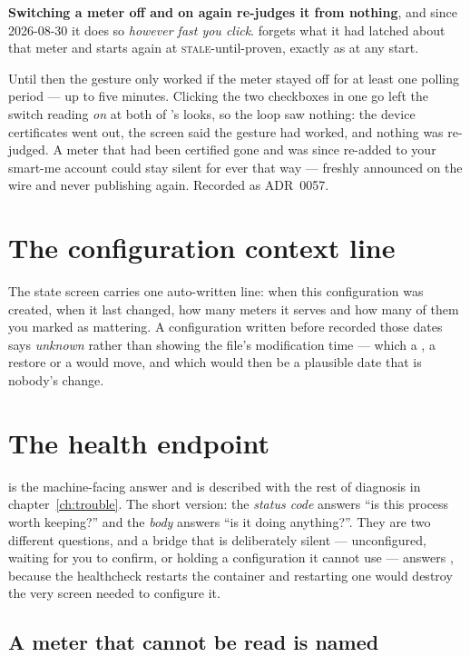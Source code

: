 \begin{note}
\textbf{Switching a meter off and on again re-judges it from nothing}, and since 2026-08-30 it
does so \emph{however fast you click}. \prog forgets what it had latched about that meter and
starts again at \textsc{stale}-until-proven, exactly as at any start.

Until then the gesture only worked if the meter stayed off for at least one polling period ---
up to five minutes. Clicking the two checkboxes in one go left the switch reading \emph{on} at
both of \prog's looks, so the loop saw nothing: the device certificates went out, the screen
said the gesture had worked, and nothing was re-judged. A meter that had been certified gone and
was since re-added to your smart-me account could stay silent for ever that way --- freshly
announced on the wire and never publishing again. Recorded as ADR~0057.
\end{note}

\section{The configuration context line}

The state screen carries one auto-written line: when this configuration was created, when it
last changed, how many meters it serves and how many of them you marked as mattering. A
configuration written before \prog recorded those dates says \emph{unknown} rather than
showing the file's modification time --- which a , a restore or a 
would move, and which would then be a plausible date that is nobody's change.

\section{The health endpoint}
\label{sec:healthz}

 is the machine-facing answer and is described with the rest of
diagnosis in chapter~\ref{ch:trouble}. The short version: the \emph{status code} answers
``is this process worth keeping?'' and the \emph{body} answers ``is it doing anything?''.
They are two different questions, and a bridge that is deliberately silent --- unconfigured,
waiting for you to confirm, or holding a configuration it cannot use --- answers ,
because the healthcheck restarts the container and restarting one would destroy the very
screen needed to configure it.

\subsection{A meter that cannot be read is named}

